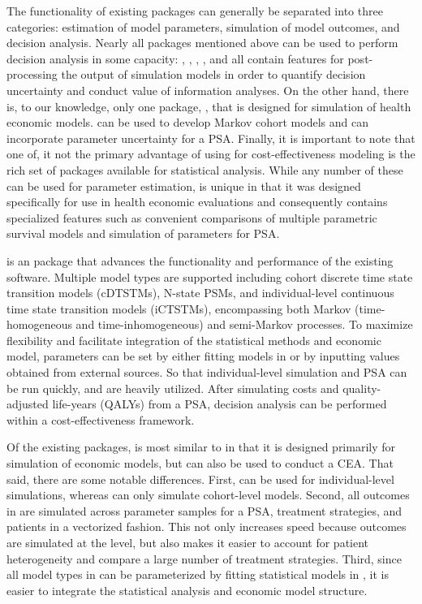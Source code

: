 \documentclass[article, nojss]{jss}\usepackage[]{graphicx}\usepackage[]{color}
\begin{document}
The functionality of existing packages can generally be separated into three categories: estimation of model parameters, simulation of model outcomes, and decision analysis. Nearly all packages mentioned above can be used to perform decision analysis in some capacity: , , , , and  all contain features for post-processing the output of simulation models in order to quantify decision uncertainty and conduct value of information analyses. On the other hand, there is, to our knowledge, only one package, , that is designed for simulation of health economic models.  can be used to develop Markov cohort models and can incorporate parameter uncertainty for a PSA. Finally, it is important to note that one of, it not the primary advantage of using  for cost-effectiveness modeling is the rich set of packages available for statistical analysis. While any number of these can be used for parameter estimation,  is unique in that it was designed specifically for use in health economic evaluations and consequently contains specialized features such as convenient comparisons of multiple parametric survival models and simulation of parameters for PSA.

 is an  package that advances the functionality and performance of the existing software. Multiple model types are supported including cohort discrete time state transition models (cDTSTMs), N-state PSMs, and individual-level continuous time state transition models (iCTSTMs), encompassing both Markov (time-homogeneous and time-inhomogeneous) and semi-Markov processes. To maximize flexibility and facilitate integration of the statistical methods and economic model, parameters can be set by either fitting models in  or by inputting values obtained from external sources. So that individual-level simulation and PSA can be run quickly,  \citep{eddelbuettel2011rcpp, eddelbuettel2013rcpp, eddelbuettel2018rcpp} and  \citep{dowle2021datatable} are heavily utilized. After simulating costs and quality-adjusted life-years (QALYs) from a PSA, decision analysis can be performed within a cost-effectiveness framework.

Of the existing packages,  is most similar to  in that it is designed primarily for simulation of economic models, but can also be used to conduct a CEA. That said, there are some notable differences. First,  can be used for individual-level simulations, whereas  can only simulate cohort-level models. Second, all outcomes in  are simulated across parameter samples for a PSA, treatment strategies, and patients in a vectorized fashion. This not only increases speed because outcomes are simulated at the  level, but also makes it easier to account for patient heterogeneity and compare a large number of treatment strategies. Third, since all model types in  can be parameterized by fitting statistical models in , it is easier to integrate the statistical analysis and economic model structure.
\end{document}
